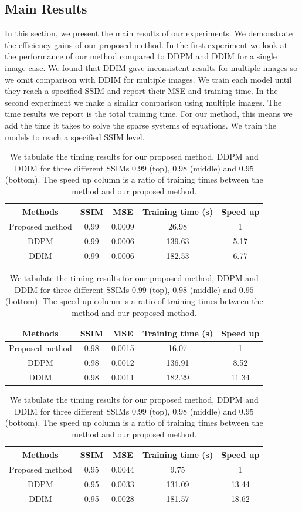 \documentclass[]{interact}
\theoremstyle{plain}%
\theoremstyle{definition}
\theoremstyle{remark}
\begin{document}
\subsection{Main Results}
In this section, we present the main results of our experiments. We demonstrate the efficiency gains of our proposed method. In the first experiment we look at the performance of our method compared to DDPM and DDIM for a single image case. We found that DDIM gave inconsistent results for multiple images so we omit comparison with DDIM for multiple images. We train each model until they reach a specified SSIM and report their MSE and training time. In the second experiment we make a similar comparison using multiple images. The time results we report is the total training time. For our method, this means we add the time it takes to solve the sparse systems of equations. We train the models to reach a specified SSIM level.
\begin{table}[htbp]
    \centering
    
    \begin{tabular}{|c|c|c|c|c|}
\hline 
 Methods& SSIM&MSE &Training time (s) &Speed up\\ \hline\hline 
     Proposed method &0.99&   0.0009&26.98 & 1\\ \hline 
     DDPM &0.99& 
     0.0006&139.63 &5.17\\ \hline 
      DDIM&0.99& 0.0006&182.53 &6.77\\ \hline\end{tabular}

    \begin{tabular}{|c|c|c|c|c|}
\hline 
 Methods& SSIM&MSE &Training time (s) &Speed up\\ \hline\hline 
     Proposed method &0.98&   0.0015&16.07 &1\\ \hline 
     DDPM &0.98& 
     0.0012&136.91 &8.52\\ \hline 
      DDIM&0.98& 0.0011&182.29 &11.34\\ \hline\end{tabular}
    
    \begin{tabular}{|c|c|c|c|c|}
\hline 
 Methods& SSIM&MSE &Training time (s) &Speed up\\ \hline\hline 
     Proposed method &0.95&   0.0044&9.75 &1\\ \hline 
     DDPM &0.95& 
     0.0033&131.09 &13.44\\ \hline 
      DDIM&0.95& 0.0028&181.57 &18.62\\ \hline\end{tabular}

    \caption{We tabulate the timing results for our proposed method, DDPM and DDIM for three different SSIMs $0.99$ (top), $0.98$ (middle) and $0.95$ (bottom). The speed up column is a ratio of training times between the method and our proposed method.}
    \label{tab:timing_table_cifar1}
\end{table}
\end{document}
